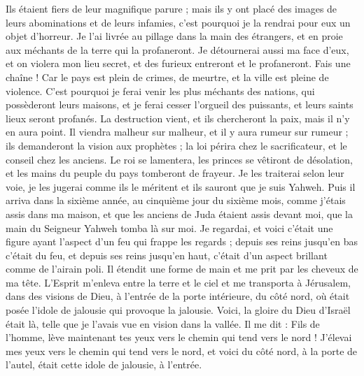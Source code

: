 \begin{multicols}{2}
Ils étaient fiers de leur magnifique parure ; mais ils y ont placé des images de leurs abominations et de leurs infamies, c'est pourquoi je la rendrai pour eux un objet d'horreur.
Je l'ai livrée au pillage dans la main des étrangers, et en proie aux méchants de la terre qui la profaneront.
Je détournerai aussi ma face d'eux, et on violera mon lieu secret, et des furieux entreront et le profaneront.
Fais une chaîne ! Car le pays est plein de crimes, de meurtre, et la ville est pleine de violence.
C'est pourquoi je ferai venir les plus méchants des nations, qui possèderont leurs maisons, et je ferai cesser l'orgueil des puissants, et leurs saints lieux seront profanés.
La destruction vient, et ils chercheront la paix, mais il n'y en aura point.
Il viendra malheur sur malheur, et il y aura rumeur sur rumeur ; ils demanderont la vision aux prophètes ; la loi périra chez le sacrificateur, et le conseil chez les anciens.
Le roi se lamentera, les princes se vêtiront de désolation, et les mains du peuple du pays tomberont de frayeur. Je les traiterai selon leur voie, je les jugerai comme ils le méritent et ils sauront que je suis Yahweh.
\VerseOne{}Puis il arriva dans la sixième année, au cinquième jour du sixième mois, comme j'étais assis dans ma maison, et que les anciens de Juda étaient assis devant moi, que la main du Seigneur Yahweh tomba là sur moi.
Je regardai, et voici c'était une figure ayant l'aspect d'un feu qui frappe les regards ; depuis ses reins jusqu'en bas c'était du feu, et depuis ses reins jusqu'en haut, c'était d'un aspect brillant comme de l'airain poli.
Il étendit une forme de main et me prit par les cheveux de ma tête. L'Esprit m'enleva entre la terre et le ciel et me transporta à Jérusalem, dans des visions de Dieu, à l'entrée de la porte intérieure, du côté nord, où était posée l'idole de jalousie qui provoque la jalousie.
Voici, la gloire du Dieu d'Israël était là, telle que je l'avais vue en vision dans la vallée.
Il me dit : Fils de l'homme, lève maintenant tes yeux vers le chemin qui tend vers le nord ! J'élevai mes yeux vers le chemin qui tend vers le nord, et voici du côté nord, à la porte de l'autel, était cette idole de jalousie, à l'entrée.

\end{multicols}
